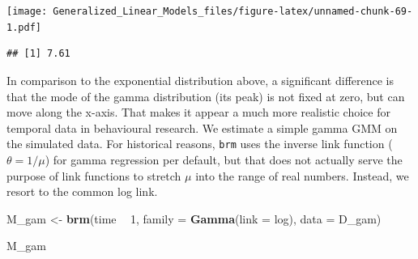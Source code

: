 \documentclass[]{svmono}
\newenvironment{Shaded}{\begin{snugshade}}{\end{snugshade}}
\newcommand{\KeywordTok}[1]{\textcolor[rgb]{0.13,0.29,0.53}{\textbf{#1}}}
\newcommand{\DataTypeTok}[1]{\textcolor[rgb]{0.13,0.29,0.53}{#1}}
\newcommand{\DecValTok}[1]{\textcolor[rgb]{0.00,0.00,0.81}{#1}}
\newcommand{\StringTok}[1]{\textcolor[rgb]{0.31,0.60,0.02}{#1}}
\newcommand{\OperatorTok}[1]{\textcolor[rgb]{0.81,0.36,0.00}{\textbf{#1}}}
\newcommand{\NormalTok}[1]{#1}
\theoremstyle{definition}
\theoremstyle{definition}
\theoremstyle{definition}
\theoremstyle{remark}
\begin{document}
\begin{Shaded}
\end{Shaded}

\texttt{[image: Generalized\_Linear\_Models\_files/figure-latex/unnamed-chunk-69-1.pdf]}

\begin{Shaded}
\end{Shaded}

\begin{verbatim}
## [1] 7.61
\end{verbatim}

In comparison to the exponential distribution above, a significant
difference is that the mode of the gamma distribution (its peak) is not
fixed at zero, but can move along the x-axis. That makes it appear a
much more realistic choice for temporal data in behavioural research. We
estimate a simple gamma GMM on the simulated data. For historical
reasons, \texttt{brm} uses the inverse link function
(\(\theta = 1/\mu\)) for gamma regression per default, but that does not
actually serve the purpose of link functions to stretch \(\mu\) into the
range of real numbers. Instead, we resort to the common log link.

\begin{Shaded}
\begin{Highlighting}[]
\NormalTok{M_gam <-}\StringTok{ }\KeywordTok{brm}\NormalTok{(time }\OperatorTok{~}\StringTok{ }\DecValTok{1}\NormalTok{, }
             \DataTypeTok{family =} \KeywordTok{Gamma}\NormalTok{(}\DataTypeTok{link =}\NormalTok{ log), }
             \DataTypeTok{data =}\NormalTok{ D_gam)}

\NormalTok{M_gam}
\end{Highlighting}
\end{Shaded}
\end{document}
